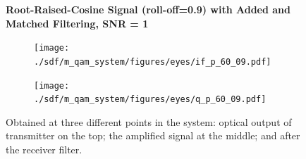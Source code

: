 \begin{figure}[H]
		\centering
	\textbf{Root-Raised-Cosine Signal (roll-off=0.9) with Added  and Matched Filtering, SNR = 1}
	\begin{minipage}{\linewidth}
		\centering
	\begin{subfigure}{.45\textwidth}
		\centering
		\texttt{[image: ./sdf/m\_qam\_system/figures/eyes/if\_p\_60\_09.pdf]}
	\end{subfigure}
	\begin{subfigure}{.45\textwidth}
		\centering
		\texttt{[image: ./sdf/m\_qam\_system/figures/eyes/q\_p\_60\_09.pdf]}
	\end{subfigure}
	
	\caption{
		Obtained at three different points in the system: optical output of transmitter on the top;
		the amplified signal at the middle; and
		after the receiver filter.
		\label{fig:eyes_n_rrc_60_09}}
	\end{minipage}
\end{figure}


